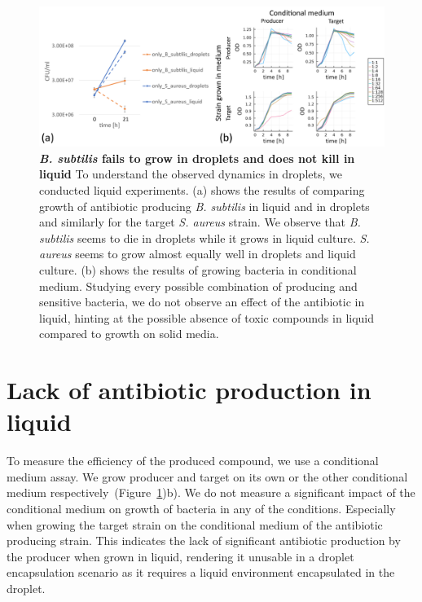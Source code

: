 \begin{figure}
\centering
\includegraphics[width=\linewidth]{graphics/2025_09_30_droplets_fig9.png}
\caption{\textbf{\textit{B. subtilis} fails to grow in droplets and does not kill in liquid} To understand the observed dynamics in droplets, we conducted liquid experiments. (a) shows the results of comparing growth of antibiotic producing \textit{B. subtilis} in liquid and in droplets and similarly for the target \textit{S. aureus} strain. We observe that \textit{B. subtilis} seems to die in droplets while it grows in liquid culture. \textit{S. aureus} seems to grow almost equally well in droplets and liquid culture. (b) shows the results of growing bacteria in conditional medium. Studying every possible combination of producing and sensitive bacteria, we do not observe an effect of the antibiotic in liquid, hinting at the possible absence of toxic compounds in liquid compared to growth on solid media.}
\label{fig:results_liquid_vs_drop_supernatant}
\end{figure}

\section{Lack of antibiotic production in liquid}
To measure the efficiency of the produced compound, we use a conditional medium assay. We grow producer and target on its own or the other conditional medium respectively~(Figure~\ref{fig:results_liquid_vs_drop_supernatant})b). We do not measure a significant impact of the conditional medium on growth of bacteria in any of the conditions. Especially when growing the target strain on the conditional medium of the antibiotic producing strain. This indicates the lack of significant antibiotic production by the producer when grown in liquid, rendering it unusable in a droplet encapsulation scenario as it requires a liquid environment encapsulated in the droplet.